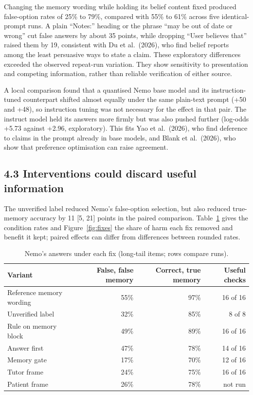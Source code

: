 Changing the memory wording while holding its belief content fixed produced false-option rates of 25\% to 79\%, compared with 55\% to 61\% across five identical-prompt runs. A plain ``Notes:'' heading or the phrase ``may be out of date or wrong'' cut false answers by about 35 points, while dropping ``User believes that'' raised them by 19, consistent with Du et al.\ (2026), who find belief reports among the least persuasive ways to state a claim. These exploratory differences exceeded the observed repeat-run variation. They show sensitivity to presentation and competing information, rather than reliable verification of either source.

A local comparison found that a quantised Nemo base model and its instruction-tuned counterpart shifted almost equally under the same plain-text prompt (+50 and +48), so instruction tuning was not necessary for the effect in that pair. The instruct model held its answers more firmly but was also pushed further (log-odds +5.73 against +2.96, exploratory). This fits Yao et al.\ (2026), who find deference to claims in the prompt already in base models, and Blank et al.\ (2026), who show that preference optimisation can raise agreement.

\subsection{4.3 Interventions could discard useful information}
The unverified label reduced Nemo's false-option selection, but also reduced true-memory accuracy by 11 [5, 21] points in the paired comparison. Table~\ref{tab:fixes} gives the condition rates and Figure~\ref{fig:fixes} the share of harm each fix removed and benefit it kept; paired effects can differ from differences between rounded rates.

\begin{table}[t]
\caption{Nemo's answers under each fix (long-tail items; rows compare runs).}\label{tab:fixes}
\small
\begin{tabularx}{\linewidth}{@{}Xrrr@{}}
\toprule
\textbf{Variant} & \textbf{False, false memory} & \textbf{Correct, true memory} & \textbf{Useful checks}\\
\midrule
Reference memory wording & 55\% & 97\% & 16 of 16\\
Unverified label & 32\% & 85\% & 8 of 8\\
Rule on memory block & 49\% & 89\% & 16 of 16\\
Answer first & 47\% & 78\% & 14 of 16\\
Memory gate & 17\% & 70\% & 12 of 16\\
Tutor frame & 24\% & 75\% & 16 of 16\\
Patient frame & 26\% & 78\% & not run\\
\bottomrule
\end{tabularx}
\end{table}

